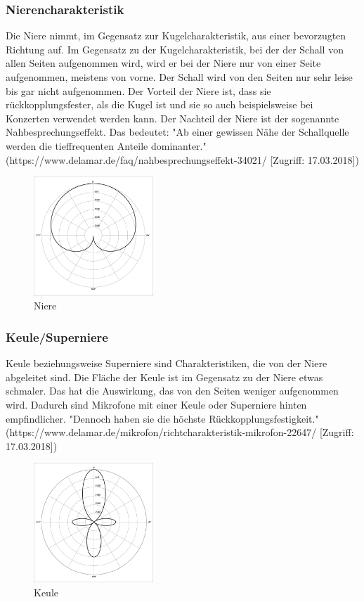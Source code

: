 \subsubsection{Nierencharakteristik}
Die Niere nimmt, im Gegensatz zur Kugelcharakteristik, aus einer bevorzugten Richtung auf. Im Gegensatz zu der Kugelcharakteristik, bei der der Schall von allen Seiten aufgenommen wird, wird er bei der Niere nur von einer Seite aufgenommen, meistens von vorne. Der Schall wird von den Seiten nur sehr leise bis gar nicht aufgenommen. Der Vorteil der Niere ist, dass sie rückkopplungsfester, als die Kugel ist und sie so auch beispielsweise bei Konzerten verwendet werden kann. Der Nachteil der Niere ist der sogenannte Nahbesprechungseffekt.\citep{naheffekt}\citep{kugel} Das bedeutet: "Ab einer gewissen Nähe der Schallquelle werden die tieffrequenten Anteile dominanter." (https://www.delamar.de/faq/nahbesprechungseffekt-34021/ [Zugriff: 17.03.2018])
\begin{figure}[H]
	\centering
	\includegraphics[width=0.4\textwidth]{abb5} 
	\caption[Niere]{Niere\footnotemark}
\end{figure}
\subsubsection{Keule/Superniere}
Keule beziehungsweise Superniere sind Charakteristiken, die von der Niere abgeleitet sind. Die Fläche der Keule ist im Gegensatz zu der Niere etwas schmaler. Das hat die Auswirkung, das von den Seiten weniger aufgenommen wird. Dadurch sind Mikrofone mit einer Keule oder Superniere hinten empfindlicher.\citep{kugel} "Dennoch haben sie die höchste Rückkopplungsfestigkeit." (https://www.delamar.de/mikrofon/richtcharakteristik-mikrofon-22647/ [Zugriff: 17.03.2018])
\begin{figure}[H]
	\centering
	\includegraphics[width=0.4\textwidth]{abb6} 
	\caption[Keule]{Keule\footnotemark}
\end{figure}
